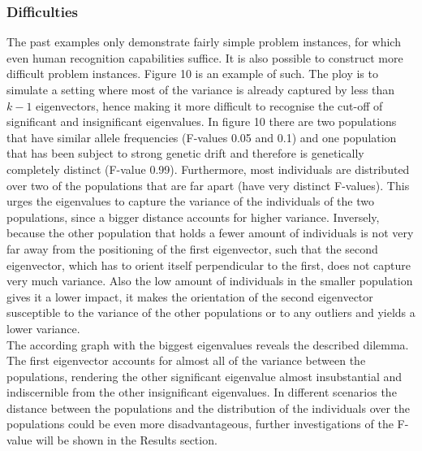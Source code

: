 \documentclass[a4paper, 11pt]{article}
\begin{document}
\subsubsection{Difficulties}
The past examples only demonstrate fairly simple problem instances, for which even human recognition capabilities suffice. It is also possible to construct more difficult problem instances. Figure 10 is an example of such. The ploy is to simulate a setting where most of the variance is already captured by less than $k-1$ eigenvectors, hence making it more difficult to recognise the cut-off of significant and insignificant eigenvalues. In figure 10 there are two populations that have similar allele frequencies (F-values 0.05 and 0.1) and one population that has been subject to strong genetic drift and therefore is genetically completely distinct (F-value 0.99). Furthermore, most individuals are distributed over two of the populations that are far apart (have very distinct F-values). This urges the eigenvalues to capture the variance of the individuals of the two populations, since a bigger distance accounts for higher variance. Inversely, because the other population that holds a fewer amount of individuals is not very far away from the positioning of the first eigenvector, such that the second eigenvector, which has to orient itself perpendicular to the first, does not capture very much variance. Also the low amount of individuals in the smaller population gives it a lower impact, it makes the orientation of the second eigenvector susceptible to the variance of the other populations or to any outliers and yields a lower variance. \\

The according graph with the biggest eigenvalues reveals the described dilemma. The first eigenvector accounts for almost all of the variance between the populations, rendering the other significant eigenvalue almost insubstantial and indiscernible from the other insignificant eigenvalues. In different scenarios the distance between the populations and the distribution of the individuals over the populations could be even more disadvantageous, further investigations of the F-value will be shown in the Results section.
\end{document}
